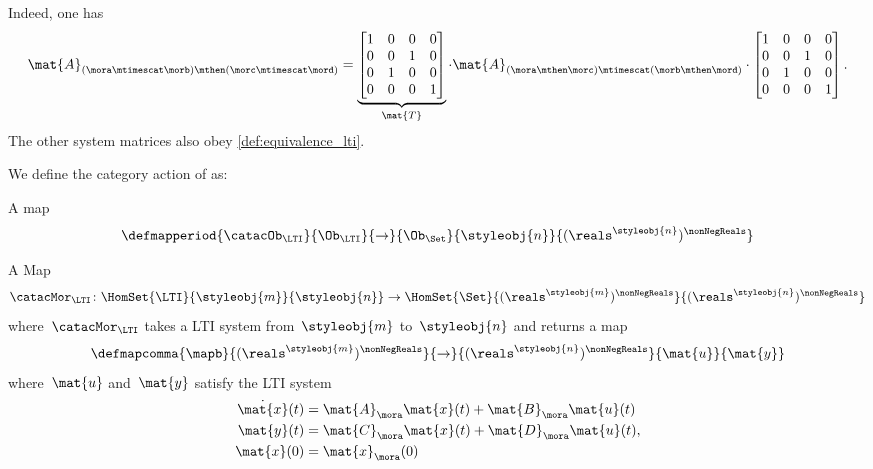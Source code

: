 \begin{example}
    Indeed, one has
    \begin{equation*}
        \mat{A}_{(\mora\mtimescat \morb)\mthen (\morc\mtimescat \mord)}=
        \underbrace{\begin{bmatrix}
                1 & 0 & 0 & 0 \\
                0 & 0 & 1 & 0 \\
                0 & 1 & 0 & 0 \\
                0 & 0 & 0 & 1
            \end{bmatrix}}_{\mat{T}}\cdot
        \mat{A}_{(\mora \mthen \morc)\mtimescat (\morb\mthen \mord)}
        \cdot
        \begin{bmatrix}
            1 & 0 & 0 & 0 \\
            0 & 0 & 1 & 0 \\
            0 & 1 & 0 & 0 \\
            0 & 0 & 0 & 1
        \end{bmatrix}.
    \end{equation*}
    The other system matrices also obey \cref{def:equivalence_lti}.
\end{example}

\begin{definition}
    \label{def:lti_cat_action}
    We define the category action of \LTI as:
    \begin{compactitem}
        \item A map
              \begin{equation*}
                  \defmapperiod{\catacOb_\LTI}{\Ob_\LTI}{\to}{\Ob_\Set}{\styleobj{n}}{(\reals^\styleobj{n})^{\nonNegReals}}
              \end{equation*}
        \item A Map
              \begin{equation*}
                  \catacMor_\LTI \colon \HomSet{\LTI}{\styleobj{m}}{\styleobj{n}}
                  \to
                  \HomSet{\Set}{(\reals^\styleobj{m})^{\nonNegReals}}{(\reals^\styleobj{n})^{\nonNegReals}}
              \end{equation*}
              where~$\catacMor_\LTI$ takes a LTI system from~$\styleobj{m}$ to~$\styleobj{n}$ and returns a map
              \begin{equation*}
                  \defmapcomma{\mapb}
                  {(\reals^\styleobj{m})^{\nonNegReals}}
                  {\to}
                  {(\reals^\styleobj{n})^{\nonNegReals}}
                  {\mat{u}}
                  {\mat{y}}
              \end{equation*}
              where~$\mat{u}$ and~$\mat{y}$ satisfy the LTI system
              \begin{align*}
                  \dot{\mat{x}}(t) & = \mat{A}_\mora \mat{x}(t) + \mat{B}_\mora\mat{u}(t) \\
                  \mat{y}(t)       & = \mat{C}_\mora\mat{x}(t) + \mat{D}_\mora\mat{u}(t) , \\
                  \mat{x}(0)       & =\mat{x}_\mora(0)
              \end{align*}
    \end{compactitem}
\end{definition}

